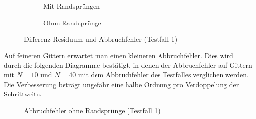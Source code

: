 \begin{figure}[ht]
\centering
   \begin{subfigure}{0.49\linewidth} \centering
  \caption{Mit Randsprüngen}
   \end{subfigure}
   \begin{subfigure}{0.49\linewidth} \centering
  \caption{Ohne Randsprünge}
   \end{subfigure}
   \caption{Differenz Residuum und Abbruchfehler (Testfall 1)}
\end{figure}
Auf feineren Gittern erwartet man einen kleineren Abbruchfehler. Dies
wird durch die folgenden Diagramme bestätigt, in denen der Abbruchfehler auf
Gittern mit $N=10$ und $N=40$ mit dem Abbruchfehler des Testfalles verglichen werden.
Die Verbesserung beträgt ungefähr eine halbe Ordnung pro Verdoppelung der Schrittweite.
\begin{figure}[ht]
\centering
{}
\caption{Abbruchfehler ohne Randsprünge (Testfall 1)}
\end{figure}
